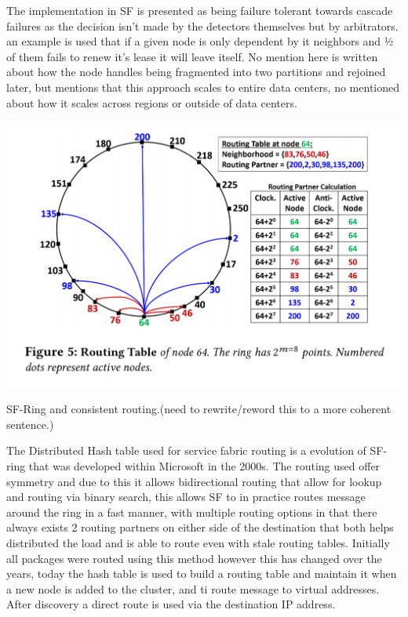 \documentclass[a4paper,10pt,titlepage]{report}
\begin{document}
    The implementation in SF is presented as being failure tolerant towards cascade failures as the decision isn't made by the detectors themselves but by arbitrators. an example is used that if a given node is only dependent by it neighbors and ½ of them fails to renew it's lease it will leave itself. No mention here is written about how the node handles being fragmented into two partitions and rejoined later, but mentions that this approach scales to entire data centers, no mentioned about how it scales across regions or outside of data centers.\\
    \vspace{5mm}

    \includegraphics[scale=0.3]{images/servicefabric-fig-ring-topology.jpeg}

    SF-Ring and consistent routing.(need to rewrite/reword this to a more coherent sentence.)

    The Distributed Hash table used for service fabric routing is a evolution of SF-ring that was developed within Microsoft in the 2000s. The routing used offer symmetry and due to this it allows bidirectional routing that allow for lookup and routing via binary search, this allows SF to in practice routes message around the ring in a fast manner, with multiple routing options in that there always exists 2 routing partners on either side of the destination that both helps distributed the load and is able to route even with stale routing tables. Initially all packages were routed using this method however this has changed over the years, today the hash table is used to build a routing table and maintain it when a new node is added to the cluster, and ti route message to virtual addresses. After discovery a direct route is used via the destination IP address. \\
    \vspace{5mm}
\end{document}
